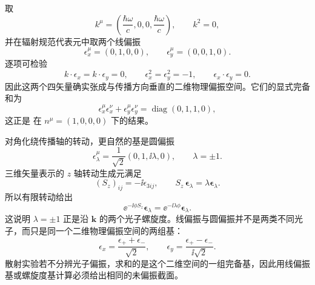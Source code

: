\begin{exbox}[$z$ 方向光子的偏振与螺旋度]
取
\begin{equation*}
 k^\mu=\left(\frac{\hbar\omega}{c},0,0,\frac{\hbar\omega}{c}\right),
 \qquad k^2=0,
\end{equation*}
并在辐射规范代表元中取两个线偏振
\begin{equation*}
 \epsilon_x^\mu=(0,1,0,0),
 \qquad
 \epsilon_y^\mu=(0,0,1,0).
\end{equation*}
逐项可检验
\begin{equation*}
 k\!\cdot\epsilon_x=k\!\cdot\epsilon_y=0,
 \qquad
 \epsilon_x^2=\epsilon_y^2=-1,
 \qquad
 \epsilon_x\!\cdot\epsilon_y=0.
\end{equation*}
因此这两个四矢量确实张成与传播方向垂直的二维物理偏振空间。它们的显式完备和为
\begin{equation*}
 \epsilon_x^\mu\epsilon_x^\nu
 +\epsilon_y^\mu\epsilon_y^\nu
 =\operatorname{diag}(0,1,1,0),
\end{equation*}
这正是 在 $n^\mu=(1,0,0,0)$ 下的结果。

对角化绕传播轴的转动，更自然的基是圆偏振
\begin{equation}
 \epsilon_\lambda^\mu
 =\frac1{\sqrt2}
 \left(0,1,\ii\lambda,0\right),
 \qquad \lambda=\pm1.
 \label{eq:photon-circular-polarizations-dp62}
\end{equation}
三维矢量表示的 $z$ 轴转动生成元满足
\begin{equation*}
 (S_z)_{ij}=-\ii\epsilon_{3ij},
 \qquad
 S_z\,\boldsymbol\epsilon_\lambda
 =\lambda\boldsymbol\epsilon_\lambda.
\end{equation*}
所以有限转动给出
\begin{equation*}
 \ee^{-\ii\phi S_z}\boldsymbol\epsilon_\lambda
 =\ee^{-\ii\lambda\phi}\boldsymbol\epsilon_\lambda.
\end{equation*}
这说明 $\lambda=\pm1$ 正是沿 $\mathbf k$ 的两个光子螺旋度。线偏振与圆偏振并不是两类不同光子，而只是同一个二维物理偏振空间的两组基：
\begin{equation*}
 \epsilon_x=\frac{\epsilon_++\epsilon_-}{\sqrt2},
 \qquad
 \epsilon_y=\frac{\epsilon_+-\epsilon_-}{\ii\sqrt2}.
\end{equation*}
散射实验若不分辨光子偏振，求和的是这个二维空间的一组完备基，因此用线偏振基或螺旋度基计算必须给出相同的未偏振截面。
\end{exbox}


